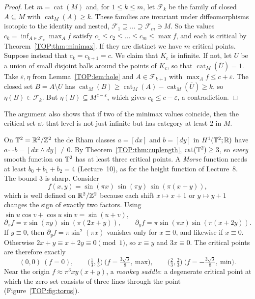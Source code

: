 \begin{proof}
Let $m=\operatorname{cat}(M)$ and, for $1\le k\le m$, let $\mathcal F_k$ be the family of closed
$A\subseteq M$ with $\operatorname{cat}_M(A)\ge k$. These families are invariant under diffeomorphisms
isotopic to the identity and nested, $\mathcal F_1\supseteq\dots\supseteq\mathcal F_m\ni M$. So the values
$c_k=\inf_{A\in\mathcal F_k}\max_Af$ satisfy $c_1\le c_2\le\dots\le c_m\le\max f$, and each is critical by
Theorem~\ref{TOP:thm:minimax}. If they are distinct we have $m$ critical points. Suppose instead that
$c_k=c_{k+1}=c$. We claim that $K_c$ is infinite. If not, let $U$ be a union of small disjoint balls around
the points of $K_c$, so that $\operatorname{cat}_M(\overline U)=1$. Take $\varepsilon,\eta$ from
Lemma~\ref{TOP:lem:hole} and $A\in\mathcal F_{k+1}$ with $\max_Af\le c+\varepsilon$. The closed set $B=A\setminus
U$ has $\operatorname{cat}_M(B)\ge\operatorname{cat}_M(A)-\operatorname{cat}_M(\overline U)\ge k$, so
$\eta(B)\in\mathcal F_k$. But $\eta(B)\subseteq M^{c-\varepsilon}$, which gives $c_k\le c-\varepsilon$, a
contradiction.
\end{proof}

The argument also shows that if two of the minimax values coincide, then the critical set at that level
is not just infinite but has category at least $2$ in $M$.

\begin{example}\label{TOP:ex:torus}
On $\mathbb{T}^2=\mathbb{R}^2/\mathbb{Z}^2$ the de Rham classes $a=[dx]$ and $b=[dy]$ in $H^1(\mathbb{T}^2;\mathbb{R})$ have
$a\smile b=[dx\wedge dy]\neq0$. By Theorem~\ref{TOP:thm:cuplength}, $\operatorname{cat}(\mathbb{T}^2)\ge3$, so \emph{every}
smooth function on $\mathbb{T}^2$ has at least three critical points. A \emph{Morse} function needs at least
$b_0+b_1+b_2=4$ (Lecture~10), as for the height function of Lecture~8. The bound $3$ is sharp. Consider
\[
  f(x,y)=\sin(\pi x)\,\sin(\pi y)\,\sin(\pi(x+y)),
\]
which is well defined on $\mathbb{R}^2/\mathbb{Z}^2$ because each shift $x\mapsto x+1$ or $y\mapsto y+1$ changes the
sign of exactly two factors. Using $\sin u\cos v+\cos u\sin v=\sin(u+v)$,
\[
  \partial_xf=\pi\sin(\pi y)\sin(\pi(2x+y)),\qquad \partial_yf=\pi\sin(\pi x)\sin(\pi(x+2y)).
\]
If $y\equiv0$, then $\partial_yf=\pi\sin^2(\pi x)$ vanishes only for $x\equiv0$, and likewise if $x\equiv0$.
Otherwise $2x+y\equiv x+2y\equiv0\pmod1$, so $x\equiv y$ and $3x\equiv0$. The critical points are therefore
exactly
\[
  (0,0)\ (f=0),\qquad \big(\tfrac13,\tfrac13\big)\ \big(f=\tfrac{3\sqrt3}8,\ \text{max}\big),\qquad
  \big(\tfrac23,\tfrac23\big)\ \big(f=-\tfrac{3\sqrt3}8,\ \text{min}\big).
\]
Near the origin $f\approx\pi^3xy(x+y)$, a \emph{monkey saddle}: a degenerate critical point at which the
zero set consists of three lines through the point (Figure~\ref{TOP:fig:torus}).
\end{example}

